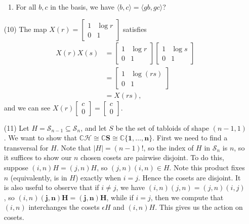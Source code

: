 \documentclass{amsart}
\newcommand{\CC}{\mathbb{C}}
\renewcommand{\S}{\mathcal{S}}
\renewcommand{\H}{\mathcal{H}}
\begin{document}
\begin{enumerate}
\begin{enumerate}
        \item For all $b,c$ in the basis, we have $\langle b,c \rangle = \langle gb,gc \rangle$?
    \end{enumerate}
    \item[(10)] The map $X(r) = \begin{bmatrix} 1 & \log r \\ 0 & 1\end{bmatrix}$ satisfies 
    \begin{align*}
        X(r)X(s) & = \begin{bmatrix} 1 & \log r \\ 0 & 1\end{bmatrix}\begin{bmatrix} 1 & \log s \\ 0 & 1\end{bmatrix} \\
        & = \begin{bmatrix} 1 & \log(rs) \\ 0 & 1\end{bmatrix} \\
        & = X(rs),
    \end{align*}
    and we can see $X(r)\begin{bmatrix} c \\ 0 \end{bmatrix} = \begin{bmatrix} c \\ 0 \end{bmatrix}$.
    \item[(11)] Let $H = \S_{n-1} \subseteq \S_n$, and let $S$ be
    the set of tabloids of shape $(n-1, 1)$.  We want to show that $\CC\H \cong \CC\mathbf{S} \cong \CC\{\mathbf{1}, \dots, \mathbf{n}\}$.  First we need to find a transversal for $H$.  Note that $|H| = (n-1)!$, so the index of $H$ in $\S_n$ is $n$, so it suffices to show our $n$ chosen cosets are pairwise disjoint.  To do this, suppose $(i,n)H = (j,n)H$, so $(j,n)(i,n) \in H$.  Note this product fixes $n$ (equivalently, is in $H$) exactly when $i = j$.  Hence the cosets are disjoint.  It is also useful to observe that if $i \ne j$, we have $(i,n)(j,n) = (j,n)(i,j)$, so $(i,n)\mathbf{(j,n)H} = \mathbf{(j,n)H}$, while if $i=j$, then we compute that $(i,n)$ interchanges the cosets $\epsilon H$ and $(i,n)H$.  This gives us the action on cosets.
    

\end{enumerate}
\end{document}
